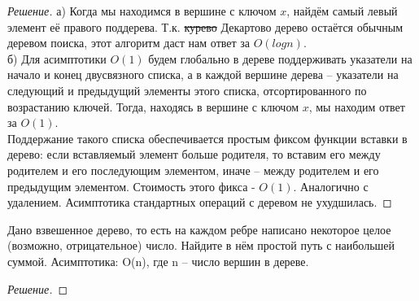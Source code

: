 \documentclass[12pt]{article}
\newenvironment{problem}[2][Задача]{\begin{trivlist}
\item[\hskip \labelsep {\bfseries #1}\hskip \labelsep {\bfseries #2.}]}{\end{trivlist}}
\newenvironment{solution}{\begin{proof}[Решение]}{\end{proof}}
\begin{document}
\begin{solution}
    а) Когда мы находимся в вершине с ключом $x$, найдём самый левый элемент её правого поддерева. Т.к. \sout{курево} Декартово дерево остаётся обычным деревом поиска, этот алгоритм даст нам ответ за $O(log n)$.
    \\б) Для асимптотики $O(1)$ будем глобально в дереве поддерживать указатели на начало и конец двусвязного списка, а в каждой вершине дерева -- указатели на следующий и предыдущий элементы этого списка, отсортированного
    по возрастанию ключей. Тогда, находясь в вершине с ключом $x$, мы находим ответ за $O(1)$. 
    \\Поддержание такого списка обеспечивается простым фиксом функции вставки в дерево: если вставляемый элемент больше родителя, то вставим его между родителем и его последующим элементом, иначе -- между родителем и его предыдущим элементом. Стоимость этого фикса - $O(1)$. Аналогично с удалением. Асимптотика стандартных операций с деревом не ухудшилась. 

\end{solution}

\newpage
\begin{problem}{5}
    Дано взвешенное дерево, то есть на каждом ребре написано некоторое целое (возможно,
отрицательное) число. Найдите в нём простой путь с наибольшей суммой. Асимптотика: O(n), где n –
число вершин в дереве.
\end{problem}

\begin{solution}
    
\end{solution}
 
 
 
 
 
\end{document}
